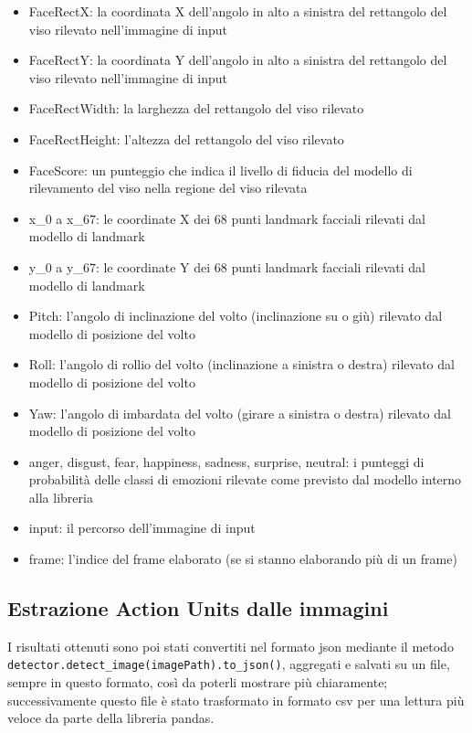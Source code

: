 \begin{itemize}
\item FaceRectX: la coordinata X dell'angolo in alto a sinistra del rettangolo del viso rilevato nell'immagine di input
\item FaceRectY: la coordinata Y dell'angolo in alto a sinistra del rettangolo del viso rilevato nell'immagine di input
\item FaceRectWidth: la larghezza del rettangolo del viso rilevato
\item FaceRectHeight: l'altezza del rettangolo del viso rilevato
\item FaceScore: un punteggio che indica il livello di fiducia del modello di rilevamento del viso nella regione del viso rilevata
\item x\_0 a x\_67: le coordinate X dei 68 punti landmark facciali rilevati dal modello di landmark
\item y\_0 a y\_67: le coordinate Y dei 68 punti landmark facciali rilevati dal modello di landmark
\item Pitch: l'angolo di inclinazione del volto (inclinazione su o giù) rilevato dal modello di posizione del volto
\item Roll: l'angolo di rollio del volto (inclinazione a sinistra o destra) rilevato dal modello di posizione del volto
\item Yaw: l'angolo di imbardata del volto (girare a sinistra o destra) rilevato dal modello di posizione del volto
\item anger, disgust, fear, happiness, sadness, surprise, neutral: i punteggi di probabilità delle classi di emozioni rilevate come previsto dal modello interno alla libreria
\item input: il percorso dell'immagine di input
\item frame: l'indice del frame elaborato (se si stanno elaborando più di un frame)
\end{itemize}

\subsection{Estrazione Action Units dalle immagini}
I risultati ottenuti sono poi stati convertiti nel formato json mediante il metodo \texttt{detector.detect_image(imagePath).to_json()}, aggregati e salvati su un file, sempre in questo formato, così da poterli mostrare più chiaramente; successivamente questo file è stato trasformato in formato csv per una lettura più veloce da parte della libreria pandas.

